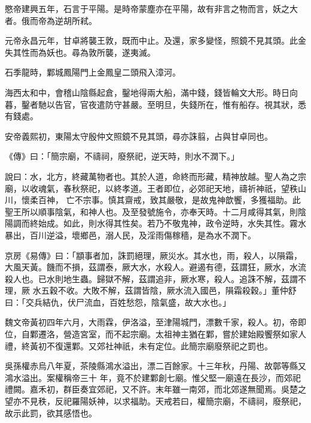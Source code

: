 \begin{pinyinscope}
 愍帝建興五年，石言于平陽。是時帝蒙塵亦在平陽，故有非言之物而言，妖之大者。俄而帝為逆胡所弒。



 元帝永昌元年，甘卓將襲王敦，既而中止。及還，家多變怪，照鏡不見其頭。此金失其性而為妖也。尋為敦所襲，遂夷滅。



 石季龍時，鄴城鳳陽門上金鳳皇二頭飛入漳河。



 海西太和中，會稽山陰縣起倉，鑿地得兩大船，滿中錢，錢皆輪文大形。時日向暮，鑿者馳以告官，官夜遣防守甚嚴。至明旦，失錢所在，惟有船存。視其狀，悉有錢處。



 安帝義熙初，東陽太守殷仲文照鏡不見其頭，尋亦誅翦，占與甘卓同也。



 《傳》曰：「簡宗廟，不禱祠，廢祭祀，逆天時，則水不潤下。」



 說曰：水，北方，終藏萬物者也。其於人道，命終而形藏，精神放越。聖人為之宗廟，以收魂氣，春秋祭祀，以終孝道。王者即位，必郊祀天地，禱祈神祇，望秩山川，懷柔百神，
 亡不宗事。慎其齋戒，致其嚴敬，是故鬼神歆饗，多獲福助。此聖王所以順事陰氣，和神人也。及至發號施令，亦奉天時。十二月咸得其氣，則陰陽調而終始成。如此，則水得其性矣。若乃不敬鬼神，政令逆時，水失其性。霧水暴出，百川逆溢，壞鄉邑，溺人民，及淫雨傷稼穡，是為水不潤下。



 京房《易傳》曰：「顓事者加，誅罰絕理，厥災水。其水也，雨，殺人，以隕霜，大風天黃。饑而不損，茲謂泰，厥大水，水殺人。避遏有德，茲謂狂，厥水，水流殺人也。已水則地生蟲。歸獄不解，茲謂追非，厥水寒，殺人。追誅不解，茲謂不理，厥
 水五穀不收。大敗不解，茲謂皆陰，厥水流入國邑，隕霜殺穀。」董仲舒曰：「交兵結仇，伏尸流血，百姓愁怨，陰氣盛，故大水也。」



 魏文帝黃初四年六月，大雨霖，伊洛溢，至津陽城門，漂數千家，殺人。初，帝即位，自鄴遷洛，營造宮室，而不起宗廟。太祖神主猶在鄴，嘗於建始殿饗祭如家人禮，終黃初不復還鄴。又郊社神祇，未有定位。此簡宗廟廢祭祀之罰也。



 吳孫權赤烏八年夏，茶陵縣鴻水溢出，漂二百餘家。十三年秋，丹陽、故鄣等縣又鴻水溢出。案權稱帝三十
 年，竟不於建鄴創七廟。惟父堅一廟遠在長沙，而郊祀禮闕。嘉禾初，群臣奏宜郊祀，又不許。末年雖一南郊，而北郊遂無聞焉。吳楚之望亦不見秩，反祀羅陽妖神，以求福助。天戒若曰，權簡宗廟，不禱祠，廢祭祀，故示此罰，欲其感悟也。




\end{pinyinscope}
